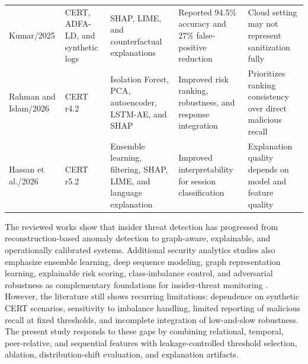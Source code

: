 \begin{table}[!tbp]
\begin{tabular}{p{}p{}p{}p{}p{}}
Kumar/2025 \cite{cloudxai2025} & CERT, ADFA-LD, and synthetic logs & SHAP, LIME, and counterfactual explanations & Reported 94.5\% accuracy and 27\% false-positive reduction & Cloud setting may not represent sanitization fully \\
Rahman and Islam/2026 \cite{aibitd2026} & CERT r4.2 & Isolation Forest, PCA, autoencoder, LSTM-AE, and SHAP & Improved risk ranking, robustness, and response integration & Prioritizes ranking consistency over direct malicious recall \\
Hassan et al./2026 \cite{illuminating2026} & CERT r5.2 & Ensemble learning, filtering, SHAP, LIME, and language explanation & Improved interpretability for session classification & Explanation quality depends on model and feature quality \\
\bottomrule
\end{tabular}
\end{table}

The reviewed works show that insider threat detection has progressed from reconstruction-based anomaly detection to graph-aware, explainable, and operationally calibrated systems. Additional security analytics studies also emphasize ensemble learning, deep sequence modeling, graph representation learning, explainable risk scoring, class-imbalance control, and adversarial robustness as complementary foundations for insider-threat monitoring \cite{ghosh2021survey,le2021log,nguyen2021xai,shen2022sequence,wang2022graph,ahmad2022cyberxai,patel2023ensemble,kim2023bertlogs,chen2024federated,park2024zero,garcia2025adaptive,okafor2025privacy,zhou2026trustworthy,ibrahim2026soc}. However, the literature still shows recurring limitations: dependence on synthetic CERT scenarios, sensitivity to imbalance handling, limited reporting of malicious recall at fixed thresholds, and incomplete integration of low-and-slow robustness. The present study responds to these gaps by combining relational, temporal, peer-relative, and sequential features with leakage-controlled threshold selection, ablation, distribution-shift evaluation, and explanation artifacts.


